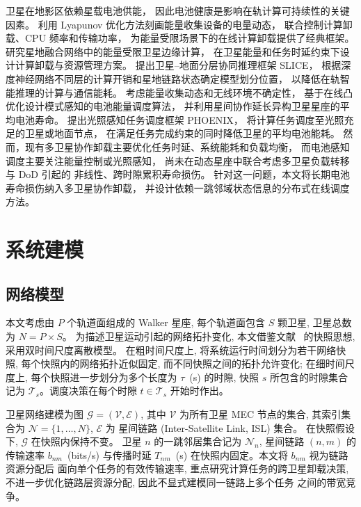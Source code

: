 \documentclass[a4paper,11pt]{article}
\begin{document}
卫星在地影区依赖星载电池供能，
因此电池健康是影响在轨计算可持续性的关键因素。
\cite{mao2016eh}利用 Lyapunov 优化方法刻画能量收集设备的电量动态，
联合控制计算卸载、CPU 频率和传输功率，
为能量受限场景下的在线计算卸载提供了经典框架。
\cite{energyconstrained}研究星地融合网络中的能量受限卫星边缘计算，
在卫星能量和任务时延约束下设计计算卸载与资源管理方案。
\cite{chen2025slice}提出卫星--地面分层协同推理框架 SLICE，
根据深度神经网络不同层的计算开销和星地链路状态确定模型划分位置，
以降低在轨智能推理的计算与通信能耗。
\cite{li2024battery}考虑能量收集动态和无线环境不确定性，
基于在线凸优化设计模式感知的电池能量调度算法，
并利用星间协作延长异构卫星星座的平均电池寿命。
\cite{liu2024phoenix}提出光照感知任务调度框架 PHOENIX，
将计算任务调度至光照充足的卫星或地面节点，
在满足任务完成约束的同时降低卫星的平均电池能耗。
然而，现有多卫星协作卸载主要优化任务时延、系统能耗和负载均衡，
而电池感知调度主要关注能量控制或光照感知，
尚未在动态星座中联合考虑多卫星负载转移与 DoD 引起的
非线性、跨时隙累积寿命损伤。
针对这一问题，本文将长期电池寿命损伤纳入多卫星协作卸载，
并设计依赖一跳邻域状态信息的分布式在线调度方法。
\section{系统建模}
\label{sec:system_model}

\subsection{网络模型}
\label{subsec:network_model}

本文考虑由 $P$ 个轨道面组成的 Walker 星座, 每个轨道面包含
$S$ 颗卫星, 卫星总数为 $N = P \times S$。
为描述卫星运动引起的网络拓扑变化, 本文借鉴文献~\cite{zhang2024mhspo}
的快照思想, 采用双时间尺度离散模型。
在粗时间尺度上, 将系统运行时间划分为若干网络快照,
每个快照内的网络拓扑近似固定, 而不同快照之间的拓扑允许变化;
在细时间尺度上, 每个快照进一步划分为多个长度为
$\tau$~(s) 的时隙, 快照 $s$ 所包含的时隙集合记为
$\mathcal{T}_s$。调度决策在每个时隙
$t \in \mathcal{T}_s$ 开始时作出。

卫星网络建模为图 $\mathcal{G} = (\mathcal{V}, \mathcal{E})$,
其中 $\mathcal{V}$ 为所有卫星 MEC 节点的集合, 其索引集合为
$\mathcal{N} = \{1, \ldots, N\}$, $\mathcal{E}$ 为
星间链路 (Inter-Satellite Link, ISL) 集合。
在快照假设下, $\mathcal{G}$ 在快照内保持不变。
卫星 $n$ 的一跳邻居集合记为 $\mathcal{N}_n$,
星间链路 $(n, m)$ 的传输速率 $b_{nm}$~(bits/s) 与传播时延
$T_{nm}$~(s) 在快照内固定。本文将 $b_{nm}$ 视为链路资源分配后
面向单个任务的有效传输速率, 重点研究计算任务的跨卫星卸载决策,
不进一步优化链路层资源分配, 因此不显式建模同一链路上多个任务
之间的带宽竞争。
\end{document}
